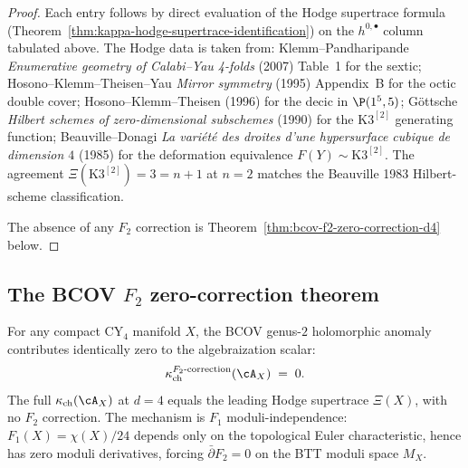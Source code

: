 \begin{proof}
Each entry follows by direct evaluation of the Hodge supertrace
formula (Theorem~\ref{thm:kappa-hodge-supertrace-identification}) on the
$h^{0,\bullet}$ column tabulated above. The Hodge data is taken from:
Klemm--Pandharipande \emph{Enumerative geometry of Calabi--Yau 4-folds}
(2007) Table~1 for the sextic; Hosono--Klemm--Theisen--Yau \emph{Mirror
symmetry} (1995) Appendix~B for the octic double cover; Hosono--Klemm--Theisen
(1996) for the decic in $\P(1^5,5)$; G\"ottsche \emph{Hilbert schemes of
zero-dimensional subschemes} (1990) for the $\mathrm{K3}^{[2]}$ generating
function; Beauville--Donagi \emph{La vari\'et\'e des droites d'une
hypersurface cubique de dimension $4$} (1985) for the deformation
equivalence $F(Y) \sim \mathrm{K3}^{[2]}$. The agreement
$\Xi(\mathrm{K3}^{[2]}) = 3 = n + 1$ at $n = 2$ matches the Beauville
1983 Hilbert-scheme classification.

The absence of any $F_2$ correction is
Theorem~\ref{thm:bcov-f2-zero-correction-d4} below.
\end{proof}

\subsection{The BCOV \texorpdfstring{$F_2$}{F-2} zero-correction theorem}
\label{subsec:cy-strat-d4-bcov-f2}

\begin{theorem}[BCOV \texorpdfstring{$F_2$}{F-2} contributes zero to \texorpdfstring{$\kappa_{\mathrm{ch}}$}{kappa-ch} at \texorpdfstring{$d = 4$}{d = 4}]
\label{thm:bcov-f2-zero-correction-d4}
For any compact CY$_4$ manifold $X$, the BCOV genus-$2$ holomorphic
anomaly contributes identically zero to the algebraization scalar:
\[
 \kappa_{\mathrm{ch}}^{F_2\text{-correction}}(\cA_X) \;=\; 0.
\]
The full $\kappa_{\mathrm{ch}}(\cA_X)$ at $d = 4$ equals the leading
Hodge supertrace $\Xi(X)$, with no $F_2$ correction. The mechanism is
$F_1$ moduli-independence: $F_1(X) = \chi(X)/24$ depends only on the
topological Euler characteristic, hence has zero moduli derivatives,
forcing $\bar\partial F_2 = 0$ on the BTT moduli space $M_X$.
\end{theorem}

